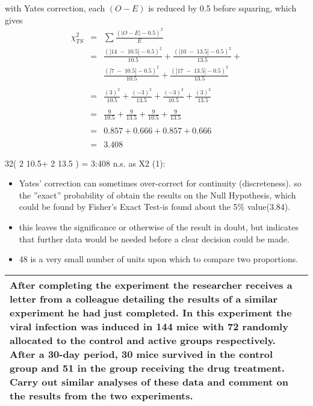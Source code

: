 \documentclass[a4paper,12pt]{article}
\begin{document}
\begin{enumerate}[(a)]
with Yates correction, each $(O-E)$ is reduced by 0.5 before squaring, which gives 
\large
\begin{eqnarray*}
\chi^2_{TS} &=&
\sum  \frac{( |O - E| -0.5)^2}{E}
\\ 
&=& \frac{(|14 \;-\;10.5|-0.5)^2}{10.5} + \frac{(|10 \;-\;13.5|-0.5)^2}{13.5} + \\
& & \frac{(|7 \;-\;10.5|-0.5)^2}{10.5} + \frac{(|17 \;-\;13.5| - 0.5)^2}{13.5} \\
& & \\
&=&\frac{(3)^2}{10.5} + \frac{(-3)^2}{13.5} + \frac{(-3)^2}{10.5} + \frac{(3)^2}{13.5} \\
& & \\
&=&\frac{9}{10.5} + \frac{9}{13.5} + \frac{9}{10.5} + \frac{9}{13.5} \\
& & \\
&=& 0.857 + 0.666 + 0.857 + 0.666\\
& & \\ &=&  3.408
\end{eqnarray*}


32( 2
10.5+
2
13.5 ) = 3:408 n.s. as X2
(1):
\begin{itemize}
    \item Yates’ correction can sometimes over-correct for continuity (discreteness). so the ”exact”
probability of obtain the results on the Null Hypothesis, which could be found by Fisher’s
Exact Test-is found about the 5\% value(3.84). 
\item this leaves the significance or otherwise
of the result in doubt, but indicates that further data would be needed before a clear
decision could be made. 
\item 48 is a very small number of units upon which to compare two
proportions.
\end{itemize}

\end{enumerate}
\newpage
\begin{table}[ht!]
\centering

\begin{tabular}{|p{15cm}|}
\hline 
\large
After completing the experiment the researcher receives a letter from a colleague detailing the results of a similar experiment he had just completed.  In this experiment the viral infection was induced in 144 mice with 72 randomly allocated to the control and active groups respectively.  
\large
After a 30-day period, 30 mice survived in the control group and 51 in the group receiving the drug treatment.  Carry out similar analyses of these data and comment on the results from the two experiments. %

\\ \hline
\end{tabular}

\end{table}
\end{document}
